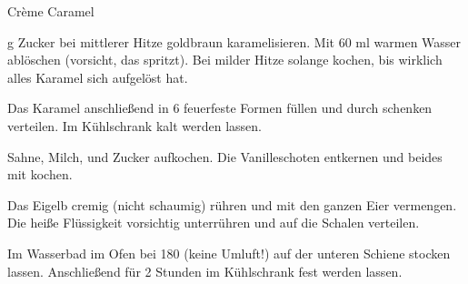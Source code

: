 \begin{recipe}{Crème Caramel}{}
  \label{Crème Caramel}
  \inglist

   g Zucker bei mittlerer Hitze goldbraun karamelisieren. Mit 60 ml warmen
  Wasser ablöschen (vorsicht, das spritzt). Bei milder Hitze solange kochen, bis
  wirklich alles Karamel sich aufgelöst hat.

  Das Karamel anschließend in 6 feuerfeste Formen füllen und durch schenken
  verteilen. Im Kühlschrank kalt werden lassen.

  Sahne, Milch, und Zucker aufkochen. Die Vanilleschoten entkernen und beides
  mit kochen.

  Das Eigelb cremig (nicht schaumig) rühren und mit den ganzen Eier vermengen.
  Die heiße Flüssigkeit vorsichtig unterrühren und auf die Schalen verteilen.

  Im Wasserbad im Ofen bei 180 \celsius (keine Umluft!) auf der unteren Schiene
  stocken lassen. Anschließend für 2 Stunden im Kühlschrank fest werden lassen.
\end{recipe}
